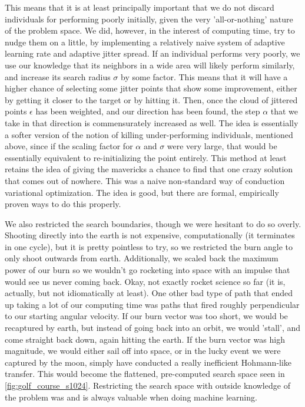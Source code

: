 This means that it is at least principally important that we do not discard individuals for performing poorly initially, given the very 'all-or-nothing' nature of the problem space. We did, however, in the interest of computing time, try to nudge them on a little, by implementing a relatively naive system of adaptive learning rate and adaptive jitter spread. If an individual performs very poorly, we use our knowledge that its neighbors in a wide area will likely perform similarly, and increase its search radius $\sigma$ by some factor. This means that it will have a higher chance of selecting some jitter points that show some improvement, either by getting it closer to the target or by hitting it. Then, once the cloud of jittered points $\epsilon$ has been weighted, and our direction has been found, the step $\alpha$ that we take in that direction is commensurately increased as well. The idea is essentially a softer version of the notion of killing under-performing individuals, mentioned above, since if the scaling factor for $\alpha$ and $\sigma$ were very large, that would be essentially equivalent to re-initializing the point entirely. This method at least retains the idea of giving the mavericks a chance to find that one crazy solution that comes out of nowhere. This was a naive non-standard way of conduction variational optimization. The idea is good, but there are formal, empirically proven ways to do this properly.

We also restricted the search boundaries, though we were hesitant to do so overly. Shooting directly into the earth is not expensive, computationally (it terminates in one cycle), but it is pretty pointless to try, so we restricted the burn angle to only shoot outwards from earth. Additionally, we scaled back the maximum power of our burn so we wouldn't go rocketing into space with an impulse that would see us never coming back. Okay, not exactly rocket science so far (it is, actually, but not idiomatically at least). One other bad type of path that ended up taking a lot of our computing time was paths that fired roughly perpendicular to our starting angular velocity. If our burn vector was too short, we would be recaptured by earth, but instead of going back into an orbit, we would 'stall', and come straight back down, again hitting the earth. If the burn vector was high magnitude, we would either sail off into space, or in the lucky event we were captured by the moon, simply have conducted a really inefficient Hohmann-like transfer. This would become the flattened, pre-computed search space seen in \cref{fig:golf_course_s1024}. Restricting the search space with outside knowledge of the problem was and is always valuable when doing machine learning.

